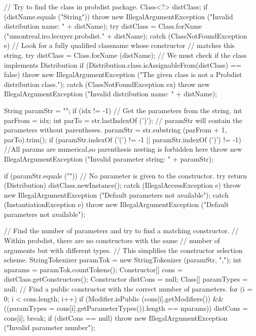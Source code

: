 \begin{code}
\begin{hide}
{{      // Try to find the class in probdist package.
      Class<?> distClass;
      if (distName.equals ("String"))
         throw new IllegalArgumentException ("Invalid distribution name: " 
                                             + distName);
      try {
         distClass = Class.forName ("umontreal.iro.lecuyer.probdist." 
                                    + distName);
      }
      catch (ClassNotFoundException e) {
         // Look for a fully qualified classname whose constructor
         //  matches this string.
         try {
            distClass = Class.forName (distName);
            // We must check if the class implements Distribution 
            if (Distribution.class.isAssignableFrom(distClass) == false)
               throw new IllegalArgumentException 
                  ("The given class is not a Probdist distribution class.");
         }
         catch (ClassNotFoundException ex) {
            throw new IllegalArgumentException ("Invalid distribution name: " 
                                                + distName);
         }
      }

      String paramStr = "";
      if (idx != -1) {
         // Get the parameters from the string.
         int parFrom = idx;
         int parTo = str.lastIndexOf (')');
         // paramStr will contain the parameters without parentheses.
         paramStr = str.substring (parFrom + 1, parTo).trim();
         if (paramStr.indexOf ('(') != -1 || paramStr.indexOf (')') != -1)
            //All params are numerical,so parenthesis nesting is forbidden here
            throw new IllegalArgumentException ("Invalid parameter string: " 
                                                + paramStr);
      }

      if (paramStr.equals ("")) {
         // No parameter is given to the constructor.
         try {
            return (Distribution) distClass.newInstance();
         }
         catch (IllegalAccessException e) {
            throw new IllegalArgumentException 
                                         ("Default parameters not available");
         }
         catch (InstantiationException e) {
            throw new IllegalArgumentException 
                                         ("Default parameters not available");
         }
      }

      // Find the number of parameters and try to find a matching constructor.
      // Within probdist, there are no constructors with the same
      // number of arguments but with different types.
      // This simplifies the constructor selection scheme.
      StringTokenizer paramTok = new StringTokenizer (paramStr, ",");
      int nparams = paramTok.countTokens();
      Constructor[] cons = distClass.getConstructors();
      Constructor distCons = null;
      Class[] paramTypes = null;
      // Find a public constructor with the correct number of parameters.
      for (i = 0; i < cons.length; i++) {
         if (Modifier.isPublic (cons[i].getModifiers()) &&
             ((paramTypes = cons[i].getParameterTypes()).length == nparams)) {
            distCons = cons[i];
            break;
         }
      }
      if (distCons == null)
         throw new IllegalArgumentException ("Invalid parameter number");

}}
\end{hide}
\end{code}
